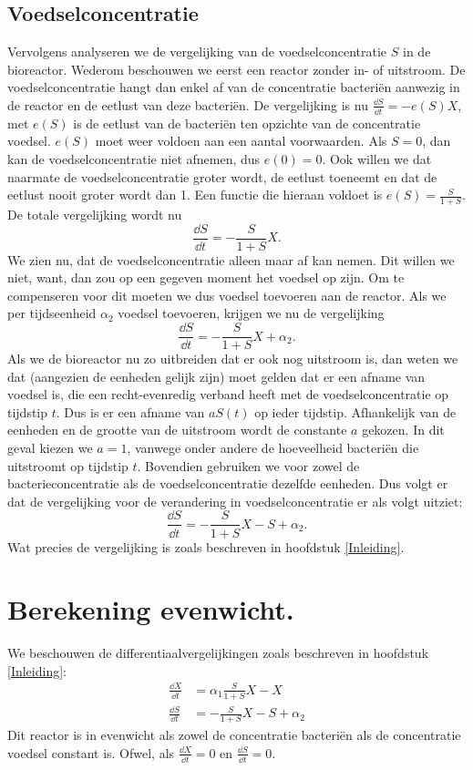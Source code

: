 \subsection*{Voedselconcentratie}
Vervolgens analyseren we de vergelijking van de voedselconcentratie $S$ in de bioreactor. Wederom beschouwen we eerst een reactor zonder in- of uitstroom. De voedselconcentratie hangt dan enkel af van de concentratie bacteri\"en aanwezig in de reactor en de eetlust van deze bacteri\"en. De vergelijking is nu $\tfrac{\dd S}{\dd t} = -e(S)X$, met $e(S)$ is de eetlust van de bacteri\"en ten opzichte van de concentratie voedsel. $e(S)$ moet weer voldoen aan een aantal voorwaarden. Als $S = 0$, dan kan de voedselconcentratie niet afnemen, dus $e(0)=0$. Ook willen we dat naarmate de voedselconcentratie groter wordt, de eetlust toeneemt en dat de eetlust nooit groter wordt dan 1. Een functie die hieraan voldoet is $e(S) = \frac{S}{1+S}$. De totale vergelijking wordt nu
\[ 
	\frac{\dd S}{\dd t}=-\frac{S}{1+S}X.
\]
We zien nu, dat de voedselconcentratie alleen maar af kan nemen. Dit willen we niet, want, dan zou op een gegeven moment het voedsel op zijn. Om te compenseren voor dit moeten we dus voedsel toevoeren aan de reactor. Als we per tijdseenheid $\alpha_2$ voedsel toevoeren, krijgen we nu de vergelijking
\[ 
	\frac{\dd S}{\dd t}=-\frac{S}{1+S}X + \alpha_2.
\]
Als we de bioreactor nu zo uitbreiden dat er ook nog uitstroom is, dan weten we dat (aangezien de eenheden gelijk zijn) moet gelden dat er een afname van voedsel is, die een recht-evenredig verband heeft met de voedselconcentratie op tijdstip $t$. Dus is er een afname van $a S(t)$ op ieder tijdstip. Afhankelijk van de eenheden en de grootte van de uitstroom wordt de constante $a$ gekozen. In dit geval kiezen we $a = 1$, vanwege onder andere de hoeveelheid bacteri\"en die uitstroomt op tijdstip $t$. Bovendien gebruiken we voor zowel de bacterieconcentratie als de voedselconcentratie dezelfde eenheden. Dus volgt er dat de vergelijking voor de verandering in voedselconcentratie er als volgt uitziet:
\begin{equation}
	\frac{\dd S}{\dd t} = -\frac{S}{1 + S} X - S + \alpha_2.
\end{equation}
Wat precies de vergelijking is zoals beschreven in hoofdstuk \ref{Inleiding}.

\section{Berekening evenwicht.}
We beschouwen de differentiaalvergelijkingen zoals beschreven in hoofdstuk \ref{Inleiding}:  
\begin{align}
	\frac{\dd X}{\dd t} &= \alpha_1 \frac{S}{1 + S} X - X 			\label{eq:be1}	\\
	\frac{\dd S}{\dd t} &= - \frac{S}{1 + S}X - S + \alpha_2 		\label{eq:be2}
\end{align}
Dit reactor is in evenwicht als zowel de concentratie bacteri\"en als de concentratie voedsel constant is. Ofwel, als $\frac{\dd X}{\dd t} = 0$ en $\frac{\dd S}{\dd t} = 0$.

